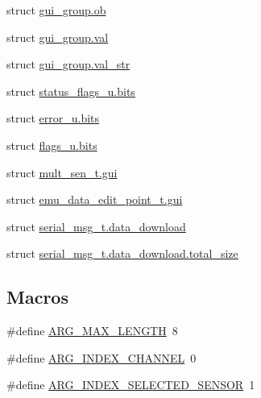 \begin{DoxyCompactItemize}
\item 
struct \hyperlink{a00001_d1/d51/a00079}{gui\+\_\+group.\+ob}
\item 
struct \hyperlink{a00001_da/dec/a00080}{gui\+\_\+group.\+val}
\item 
struct \hyperlink{a00001_d8/d53/a00081}{gui\+\_\+group.\+val\+\_\+str}
\item 
struct \hyperlink{a00001_de/d76/a00134}{status\+\_\+flags\+\_\+u.\+bits}
\item 
struct \hyperlink{a00001_d2/db1/a00070}{error\+\_\+u.\+bits}
\item 
struct \hyperlink{a00001_d9/da5/a00075}{flags\+\_\+u.\+bits}
\item 
struct \hyperlink{a00001_db/dab/a00089}{mult\+\_\+sen\+\_\+t.\+gui}
\item 
struct \hyperlink{a00001_da/d24/a00068}{emu\+\_\+data\+\_\+edit\+\_\+point\+\_\+t.\+gui}
\item 
struct \hyperlink{a00001_de/d36/a00123}{serial\+\_\+msg\+\_\+t.\+data\+\_\+download}
\item 
struct \hyperlink{a00001_da/d72/a00124}{serial\+\_\+msg\+\_\+t.\+data\+\_\+download.\+total\+\_\+size}
\end{DoxyCompactItemize}
\subsection*{Macros}
\begin{DoxyCompactItemize}
\item 
\#define \hyperlink{a00001_a8060d7351beb9451f5f6e3b692e2d9c3}{A\+R\+G\+\_\+\+M\+A\+X\+\_\+\+L\+E\+N\+G\+T\+H}~8
\item 
\#define \hyperlink{a00001_a19b4a73c575adf309d87222653af2945}{A\+R\+G\+\_\+\+I\+N\+D\+E\+X\+\_\+\+C\+H\+A\+N\+N\+E\+L}~0
\item 
\#define \hyperlink{a00001_a10ac6c7d790fd11db043965e8d08c9ad}{A\+R\+G\+\_\+\+I\+N\+D\+E\+X\+\_\+\+S\+E\+L\+E\+C\+T\+E\+D\+\_\+\+S\+E\+N\+S\+O\+R}~1
\end{DoxyCompactItemize}
